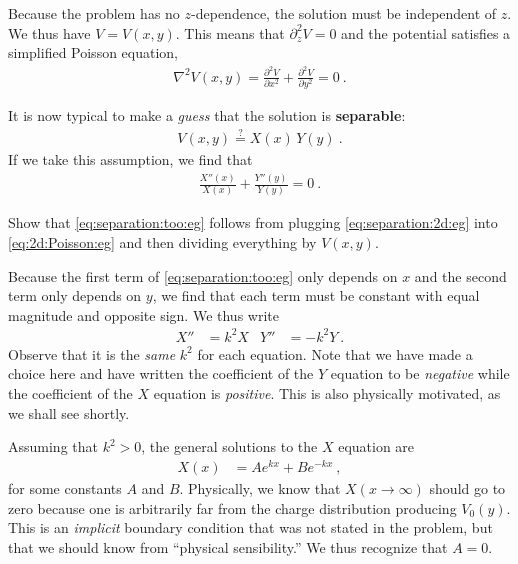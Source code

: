 Because the problem has no $z$-dependence, the solution must be independent of $z$. We thus have $V=V(x,y)$. This means that $\partial_z^2 V = 0$ and the potential satisfies a simplified Poisson equation,
\begin{align}
    \nabla^2 V(x,y) = 
    \frac{\partial^2V}{\partial x^2}
    +
    \frac{\partial^2V}{\partial y^2}
    = 0 \ .
    \label{eq:2d:Poisson:eg}
\end{align}

It is now typical to make a \emph{guess} that the solution is \textbf{separable}:
\begin{align}
    V(x,y) \stackrel{?}{=} X(x) \, Y(y)
    \ .
    \label{eq:separation:2d:eg}
\end{align}
If we take this assumption, we find that
\begin{align}
    \frac{X''(x)}{X(x)} + \frac{Y''(y)}{Y(y)} = 0 \ .
    \label{eq:separation:too:eg}
\end{align}
\begin{exercise}
Show that \eqref{eq:separation:too:eg} follows from plugging \eqref{eq:separation:2d:eg} into \eqref{eq:2d:Poisson:eg} and then dividing everything by $V(x,y)$.
\end{exercise}
Because the first term of \eqref{eq:separation:too:eg}  only depends on $x$ and the second term only depends on $y$, we find that each term must be constant with equal magnitude and opposite sign. We thus write
\begin{align}
    X'' &= k^2X & Y''&= -k^2 Y \ .
    \label{eq:two:equations}
\end{align}
Observe that it is the \emph{same} $k^2$ for each equation.
% 
Note that we have made a choice here and have written the coefficient of the $Y$ equation to be \emph{negative} while the coefficient of the $X$ equation is \emph{positive}. This is also physically motivated, as we shall see shortly.

Assuming that $k^2>0$, the general solutions to the $X$ equation are
\begin{align}
    X(x) &= Ae^{kx} + Be^{-kx} \ ,
\end{align}
for some constants $A$ and $B$. Physically, we know that $X(x\to\infty)$ should go to zero because one is arbitrarily far from the charge distribution producing $V_0(y)$. This is an \emph{implicit} boundary condition that was not stated in the problem, but that we should know from ``physical sensibility.'' We thus recognize that $A=0$.

